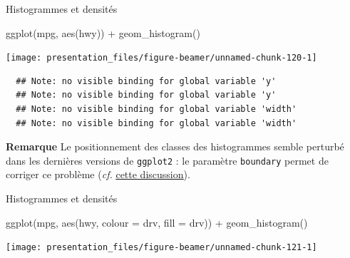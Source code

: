 \documentclass[12pt,ignorenonframetext,handout,]{beamer}
\newenvironment{Shaded}{}{}
\newcommand{\DataTypeTok}[1]{#1}
\newcommand{\KeywordTok}[1]{\textcolor[rgb]{0.00,0.00,1.00}{#1}}
\newcommand{\NormalTok}[1]{#1}
\newcommand{\OperatorTok}[1]{#1}
\newcommand{\StringTok}[1]{\textcolor[rgb]{0.00,0.50,0.50}{#1}}
\renewenvironment{Shaded}{\begin{snugshade}}{\end{snugshade}}
\newcommand{\intertitre}[1]{\textcolor{redInsee}{\textbf{#1}}}
\begin{document}
\begin{frame}[fragile]{Histogrammes et densités}
\protect\hypertarget{histogrammes-et-densites-3}{}

\footnotesize \center

\vspace{-0.3cm}

\begin{Shaded}
\begin{Highlighting}[]
\KeywordTok{ggplot}\NormalTok{(mpg, }\KeywordTok{aes}\NormalTok{(hwy)) }\OperatorTok{+}\StringTok{ }\KeywordTok{geom_histogram}\NormalTok{()}
\end{Highlighting}
\end{Shaded}

\texttt{[image: presentation\_files/figure-beamer/unnamed-chunk-120-1]}

\begin{verbatim}
  ## Note: no visible binding for global variable 'y' 
  ## Note: no visible binding for global variable 'y' 
  ## Note: no visible binding for global variable 'width' 
  ## Note: no visible binding for global variable 'width'
\end{verbatim}

\pause \raggedright \small \vspace{-0.3cm}

\intertitre{Remarque} Le positionnement des classes des histogrammes
semble perturbé dans les dernières versions de \texttt{ggplot2} : le
paramètre \texttt{boundary} permet de corriger ce problème (\emph{cf.}
\href{http://stackoverflow.com/questions/37876096/geom-histogram-wrong-bins}{\underline{cette discussion}}).

\end{frame}

\begin{frame}[fragile]{Histogrammes et densités}
\protect\hypertarget{histogrammes-et-densites-4}{}

\footnotesize \center

\begin{Shaded}
\begin{Highlighting}[]
\KeywordTok{ggplot}\NormalTok{(mpg, }\KeywordTok{aes}\NormalTok{(hwy, }\DataTypeTok{colour =}\NormalTok{ drv, }\DataTypeTok{fill =}\NormalTok{ drv)) }\OperatorTok{+}\StringTok{ }
\StringTok{  }\KeywordTok{geom_histogram}\NormalTok{()}
\end{Highlighting}
\end{Shaded}

\texttt{[image: presentation\_files/figure-beamer/unnamed-chunk-121-1]}

\end{frame}
\end{document}

